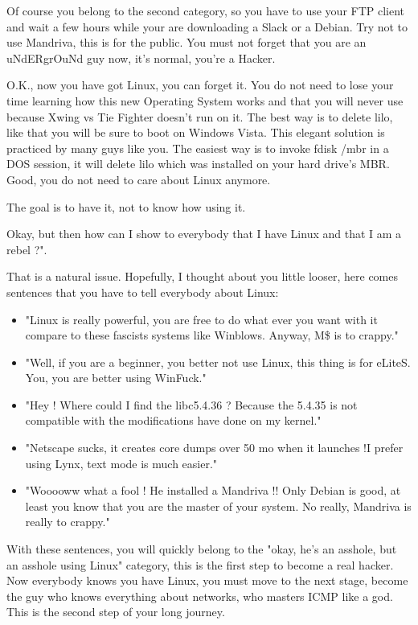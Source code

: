 Of course you belong to the second category, so you have to use your FTP client and wait a few hours while your are downloading a Slack or a Debian. Try not to use Mandriva, this is for the public. You must not forget that you are an uNdERgrOuNd guy now, it's normal, you're a Hacker.

O.K., now you have got Linux, you can forget it. You do not need to lose your time learning how this new Operating System works and that you will never use because Xwing vs Tie Fighter doesn't run on it. The best way is to delete lilo, like that you will be sure to boot on Windows Vista. This elegant solution is practiced by many guys like you. The easiest way is to invoke fdisk /mbr in a DOS session, it will delete lilo which was installed on your hard drive's MBR. Good, you do not need to care about Linux anymore.

The goal is to have it, not to know how using it.

Okay, but then how can I show to everybody that I have Linux and that I am a rebel ?". 

That is a natural issue. Hopefully, I thought about you little looser, here comes sentences that you have to tell everybody about Linux:

\begin{itemize}
	\item "Linux is really powerful, you are free to do what ever you want with it compare to these fascists systems like Winblows. Anyway, M\$ is to crappy."

	\item "Well, if you are a beginner, you better not use Linux, this thing is for eLiteS. You, you are better using WinFuck."

	\item "Hey ! Where could I find the libc5.4.36 ? Because the 5.4.35 is not compatible with the modifications have done on my kernel."

	\item "Netscape sucks, it creates core dumps over 50 mo when it launches !I prefer using Lynx, text mode is much easier."

	\item "Wooooww what a fool ! He installed a Mandriva !! Only Debian is good, at least you know that you are the master of your system. No really, Mandriva is really to crappy."
\end{itemize}

With these sentences, you will quickly belong to the "okay, he's an asshole, but an asshole using Linux" category, this is the first step to become a real hacker. Now everybody knows you have Linux, you must move to the next stage, become the guy who knows everything about networks, who masters ICMP like a god. This is the second step of your long journey.

